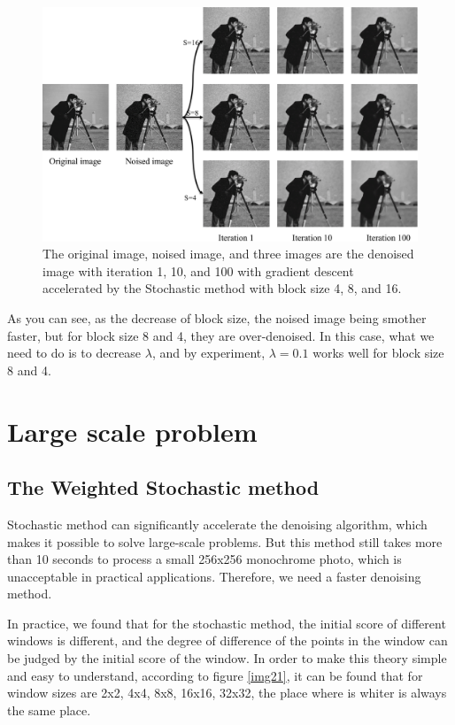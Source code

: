 \documentclass{article}
\begin{document}
\begin{figure}[h]
  \includegraphics[width=5.5in]{pic20.png}
  \centering
  \caption{The original image, noised image, and three images are the denoised image with iteration 1, 10, and 100 with gradient descent accelerated by the Stochastic method with block size 4, 8, and 16.}
  \label{img20}
\end{figure}

As you can see, as the decrease of block size, the noised image being smother faster, but for block size 8 and 4, they are over-denoised. In this case, what we need to do is to decrease $\lambda$, and by experiment, $\lambda=0.1$ works well for block size 8 and 4.

\section{Large scale problem}

\subsection{The Weighted Stochastic method}
Stochastic method can significantly accelerate the denoising algorithm, which makes it possible to solve large-scale problems. But this method still takes more than 10 seconds to process a small 256x256 monochrome photo, which is unacceptable in practical applications. Therefore, we need a faster denoising method.

In practice, we found that for the stochastic method, the initial score of different windows is different, and the degree of difference of the points in the window can be judged by the initial score of the window. In order to make this theory simple and easy to understand, according to figure \ref{img21}, it can be found that for window sizes are 2x2, 4x4, 8x8, 16x16, 32x32, the place where is whiter is always the same place.
\end{document}
